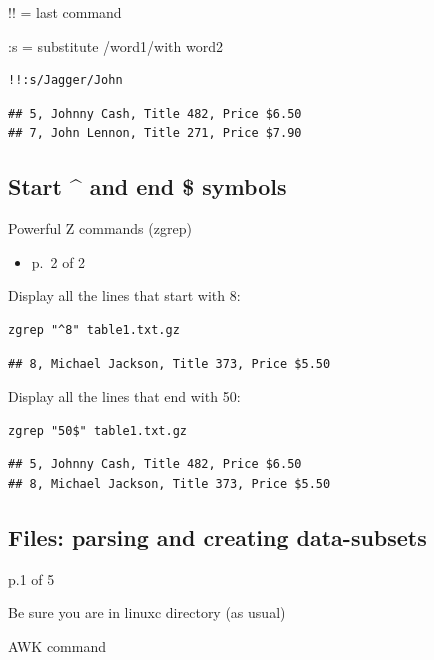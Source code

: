 \documentclass[
]{book}
\providecommand{\tightlist}{%
  \setlength{\itemsep}{0pt}\setlength{\parskip}{0pt}}
\begin{document}
!! = last command

:s = substitute /word1/with word2

\begin{verbatim}
!!:s/Jagger/John
\end{verbatim}

\begin{verbatim}
## 5, Johnny Cash, Title 482, Price $6.50
## 7, John Lennon, Title 271, Price $7.90
\end{verbatim}

\hypertarget{start-and-end-symbols}{%
\subsection{Start \^{} and end \$ symbols}\label{start-and-end-symbols}}

Powerful Z commands (zgrep)

\begin{itemize}
\tightlist
\item
  p.~2 of 2
\end{itemize}

Display all the lines that start with 8:

\begin{verbatim}
zgrep "^8" table1.txt.gz
\end{verbatim}

\begin{verbatim}
## 8, Michael Jackson, Title 373, Price $5.50
\end{verbatim}

Display all the lines that end with 50:

\begin{verbatim}
zgrep "50$" table1.txt.gz
\end{verbatim}

\begin{verbatim}
## 5, Johnny Cash, Title 482, Price $6.50
## 8, Michael Jackson, Title 373, Price $5.50
\end{verbatim}

\hypertarget{files-parsing-and-creating-data-subsets}{%
\subsection{Files: parsing and creating data-subsets}\label{files-parsing-and-creating-data-subsets}}

p.1 of 5

Be sure you are in linuxc directory (as usual)

AWK command
\end{document}
